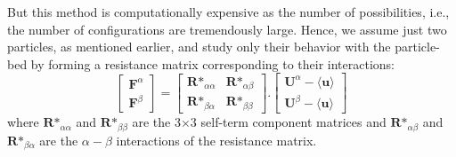 \documentclass[12pt]{article}
\begin{document}
But this method is computationally expensive as the number of possibilities, i.e., the number of configurations are tremendously large. Hence, we assume just two particles, as mentioned earlier, and study only their behavior with the particle-bed by forming a resistance matrix corresponding to their interactions:
\begin{equation}
\label{eq14}
\begin{bmatrix}
\textbf{F}^{\alpha}\\ \textbf{F}^{\beta}
\end{bmatrix}=
\begin{bmatrix}
\textbf{R*}_{\alpha \alpha}& \textbf{R*}_{\alpha\beta}\\
\textbf{R*}_{\beta\alpha} & \textbf{R*}_{\beta\beta}
\end{bmatrix} \textbf{.}
\begin{bmatrix}
\textbf{U}^{\alpha} - \langle \textbf{u} \rangle \\
\textbf{U}^{\beta} - \langle \textbf{u} \rangle
\end{bmatrix}
\end{equation}
where $\textbf{R*}_{\alpha \alpha}$ and $\textbf{R*}_{\beta\beta}$ are the 3$\times$3 self-term component matrices and 
$\textbf{R*}_{\alpha\beta}$ and $\textbf{R*}_{\beta\alpha}$ are the $\alpha - \beta$ interactions of the resistance matrix. 
\end{document}
